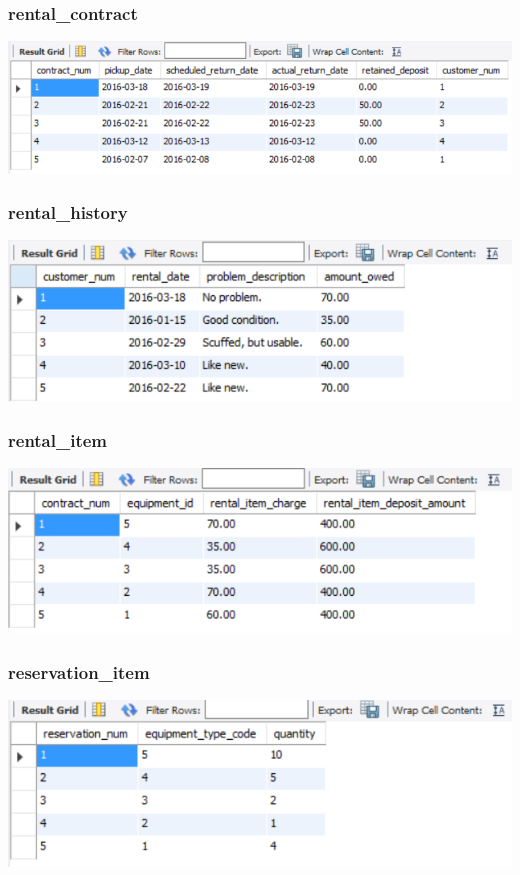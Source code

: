 \documentclass[12pt]{article}
\begin{document}
\subsubsection*{rental\_contract} \includegraphics[scale=0.65]{screenshots/tables/rental_contract_snip.PNG} \\
\subsubsection*{rental\_history} \includegraphics[scale=0.65]{screenshots/tables/rental_history_snip.PNG} \\
\subsubsection*{rental\_item} \includegraphics[scale=0.65]{screenshots/tables/rental_item_snip.PNG} \\
\subsubsection*{reservation\_item} \includegraphics[scale=0.65]{screenshots/tables/reservation_item_snip.PNG} \\
\end{document}

